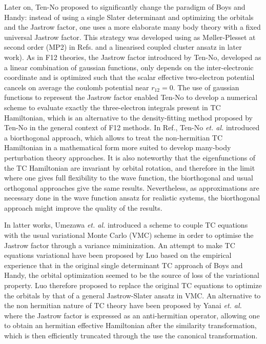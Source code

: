 \documentclass[aip,jcp,reprint,noshowkeys,superscriptaddress]{revtex4-1}
\begin{document}
Later on, Ten-No\cite{TenNo-CPL-00-a} proposed to significantly change the paradigm of Boys and Handy: instead of using a single Slater determinant and optimizing the orbitals and the Jastrow factor, one uses a more elaborate many body theory with a fixed universal Jastrow factor.  This strategy was developed using as M{\o}ller-Plesset at second order (MP2) in Refs. and a linearised coupled cluster ansatz in later work\cite{HinTanTen-CPL-02}).  
As in F12 theories, the Jastrow factor introduced by Ten-No, developed as a linear combination of gaussian functions, only depends on the inter-electronic coordinate and is optimized such that the scalar effective two-electron  potential cancels on average the coulomb potential near $r_{12}=0$. The use of gaussian functions to represent the Jastrow factor enabled Ten-No to develop a numerical scheme to evaluate exactly the three-electron integrals present in TC Hamiltonian\cite{TenNo-CPL-00-b}, which is an alternative to the density-fitting method proposed by Ten-No in the general context of F12 methods\cite{TenMan-JCP-03}. 
In Ref., Ten-No \textit{et. al.} introduced a biorthogonal approach, 
which allows to treat the non-hermitian TC Hamiltonian in a mathematical form more suited 
to develop many-body perturbation theory approaches. 
It is also noteworthy that the eigenfunctions of the TC Hamiltonian are invariant by orbital rotation, 
and therefore in the limit where one gives full flexibility to the wave function, 
the biorthogonal and usual orthogonal approaches give the same results. 
Nevertheless, as approximations are necessary done in the wave function ansatz for realistic systems, 
the biorthogonal approach might improve the quality of the results. 

In latter works, Umezawa \textit{et. al.}\cite{UmeTsu-JCP-03,UmeTsuOhnShiChi-JCP-05} introduced a scheme to couple TC equations with the usual variational Monte Carlo (VMC) scheme in order to optimise the Jastrow factor through a variance miminization. 
An attempt to make TC equations variational have been proposed by Luo\cite{Luo-JCP-10,Luo-JCP-11} based on the empirical experience that in the original single determinant TC approach of Boys and Handy, the orbital optimization seemed to be the source of loss of the variational property. Luo therefore proposed to replace the original TC equations to optimize the orbitals by that of a general Jastrow-Slater ansatz in VMC. 
An alternative to the non hermitian nature of TC theory have been proposed by Yanai \textit{et. al.}\cite{YanShi-JCP-12}  where the Jastrow factor is expressed as an anti-hermitian operator, allowing one to obtain an hermitian effective Hamiltonian after the similarity transformation, which is then efficiently truncated through the use the canonical transformation\cite{NeuYanCha-MolPhys-10}. 
\end{document}
